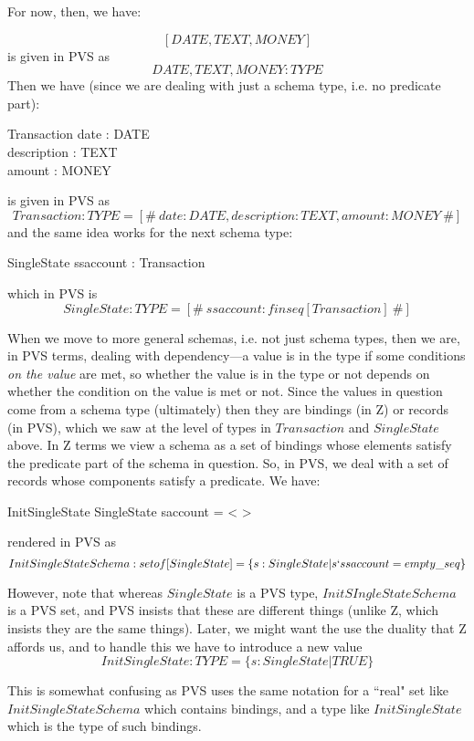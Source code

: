 \documentclass[11pt]{amsart}
\begin{document}
For now, then, we have:

\[
[DATE, TEXT, MONEY]
\]
is given in PVS as
\[
DATE, TEXT, MONEY : TYPE
\]
Then we have (since we are dealing with just a schema type, i.e. no predicate part):
\begin{schema}{Transaction}
date : DATE\\
description : TEXT\\
amount : MONEY
\end{schema}
is given in PVS as
\[
Transaction : TYPE = [\#\ date : DATE, description : TEXT, amount : MONEY\ \#]
\]
and the same idea works for the next schema type:
\begin{schema}{SingleState}
ssaccount : \seq Transaction
\end{schema}
which in PVS is
\[
SingleState : TYPE = [\#\ ssaccount :  finseq[Transaction]\ \#]
\]

When we move to more general schemas, i.e. not just schema types, then we are, in PVS terms, dealing with dependency---a value is in the type if some conditions \emph{on the value} are met, so whether the value is in the type or not depends on whether the condition on the value is met or not. Since the values in question come from a schema type (ultimately) then they are bindings (in Z) or records (in PVS), which we saw at the level of types in $Transaction$ and $SingleState$ above. In Z terms we view a schema as a set of bindings whose elements satisfy the predicate part of the schema in question. So, in PVS, we deal with a set of records whose components satisfy a predicate. We have:

\begin{schema}{InitSingleState}
SingleState
\where
saccount = < >
\end{schema}
rendered in PVS as
\[
InitSingleStateSchema : setof[SingleState] = \{ s : SingleState | s`ssaccount = empty\_seq\}
\]

However, note that whereas $SingleState$ is a PVS type, $InitSIngleStateSchema$ is a PVS set, and PVS insists that these are different things (unlike Z, which insists they are the same things). Later, we might want the use the duality that Z affords us, and to handle this we have to introduce a new value
\[
InitSingleState : TYPE = \{ s : SingleState | TRUE \}
\]

This is somewhat confusing as PVS uses the same notation for a ``real" set like $InitSingleStateSchema$ which contains bindings, and a type like $InitSingleState$ which is the type of such bindings. 
\end{document}

